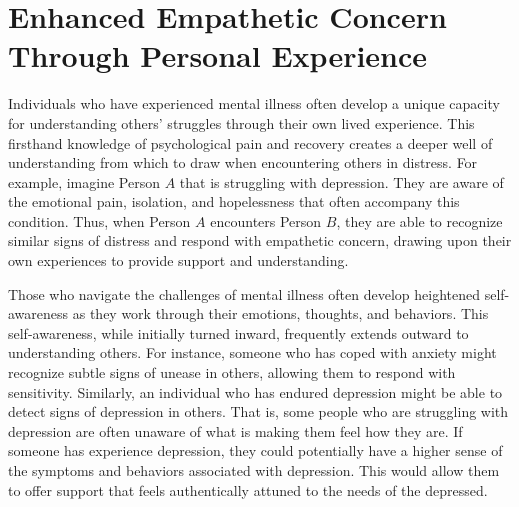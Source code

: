 \documentclass[stu]{apa7}
\begin{document}


\section{Enhanced Empathetic Concern Through Personal Experience}

Individuals who have experienced mental illness often develop a unique capacity for understanding others' struggles through their own lived experience. This firsthand knowledge of psychological pain and recovery creates a deeper well of understanding from which to draw when encountering others in distress. For example, imagine Person \(A\) that is struggling with depression. They are aware of the emotional pain, isolation, and hopelessness that often accompany this condition. Thus, when Person \(A\) encounters Person \(B\), they are able to recognize similar signs of distress and respond with empathetic concern, drawing upon their own experiences to provide support and understanding.

Those who navigate the challenges of mental illness often develop heightened self-awareness as they work through their emotions, thoughts, and behaviors. This self-awareness, while initially turned inward, frequently extends outward to understanding others. For instance, someone who has coped with anxiety might recognize subtle signs of unease in others, allowing them to respond with sensitivity. Similarly, an individual who has endured depression might be able to detect signs of depression in others. That is, some people who are struggling with depression are often unaware of what is making them feel how they are. If someone has experience depression, they could potentially have a higher sense of the symptoms and behaviors associated with depression. This would allow them to offer support that feels authentically attuned to the needs of the depressed.
\end{document}
